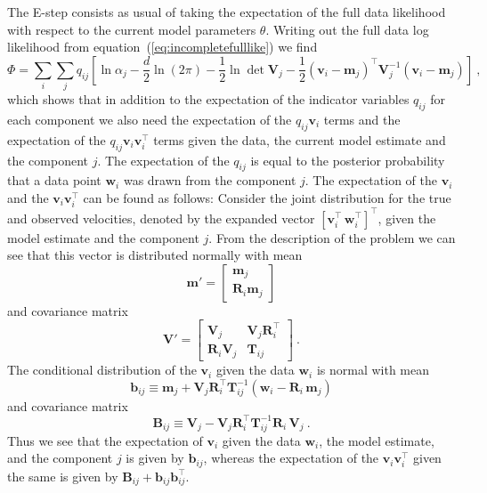 \documentclass[aoas,preprint,authoryear,round]{imsart}
\newcommand{\eqnnumber}{equation}
\renewcommand{\vec}[1]{\mathbf{#1}} %
\newcommand{\bb}{\vec{b}}
\newcommand{\mm}{\vec{m}}
\newcommand{\vv}{\vec{v}}
\newcommand{\ww}{\vec{w}}
\newcommand{\bij}{\bb_{ij}}
\newcommand{\bbij}{\bij}
\newcommand{\mmj}{\mm_j}
\newcommand{\vvi}{\vv_i}
\newcommand{\wwi}{\ww_i}
\newcommand{\ten}[1]{\mathbf{#1}} %
\newcommand{\BB}{\ten{B}}
\newcommand{\RR}{\ten{R}}
\newcommand{\TT}{\ten{T}}
\newcommand{\VV}{\ten{V}}
\newcommand{\BBij}{\BB_{ij}}
\newcommand{\RRi}{\RR_i}
\newcommand{\VVj}{\VV_{\!j}} %
\newcommand{\TTij}{\TT_{ij}}
\newcommand{\T}{^{\scriptscriptstyle \top}}   %
\newcommand{\qij}{q_{ij}}
\newcommand{\matrixleft}{\left[}
\newcommand{\matrixright}{\right]}
\begin{document}
The E-step consists as usual of taking the expectation of the
full data likelihood with respect to the current model parameters
$\theta$. Writing out the full data log likelihood from \eqnnumber\
(\ref{eq:incompletefulllike}) we find 
\begin{equation}
\Phi = \sum_i \sum_j \qij \left[ \ln \alpha_j -\frac{d}{2} \ln (2 \pi) - \frac{1}{2} \ln \det \VVj -\frac{1}{2} (\vv_i - \mmj)\T \VVj^{-1} (\vv_i - \mmj) \right]\ ,
\end{equation}
which shows that in addition to the expectation of the indicator
variables $\qij$ for each component we also need the expectation of
the $\qij\vvi$ terms and the expectation of the $\qij\vvi\vvi\T$ terms
given the data, the current model estimate and the component $j$. The
expectation of the $\qij$ is equal to the posterior probability that a
data point $\wwi$ was drawn from the component $j$. The expectation of
the $\vvi$ and the $\vvi\vvi\T$ can be found as follows: Consider the
joint distribution for the true and observed velocities, denoted by
the expanded vector $\matrixleft\vvi\T \,\wwi\T\matrixright\T$, given
the model estimate and the component $j$. From the description of the
problem we can see that this vector is distributed normally with mean
\begin{equation}\label{eq:combinedmean}
\mm' = \matrixleft \begin{array}{c} \mmj \\ \RRi\mmj \end{array}\matrixright
\end{equation}
and covariance matrix
\begin{equation}\label{eq:combinedcovar}
\VV' = \matrixleft\begin{array}{cc} \VVj & \VVj\RRi\T \\ \RRi\VVj & \TTij \end{array} \matrixright \ .
\end{equation}
The conditional distribution of the $\vvi$ given the data $\wwi$ is
normal with mean
\begin{equation}\label{eq:bbij}
\bbij \equiv \mmj + \VVj \RRi\T \TTij^{-1} (\wwi - \RRi\,\mmj)
\end{equation}
and covariance matrix
\begin{equation}\label{eq:BBij}
\BBij \equiv \VVj - \VVj\RRi\T \TTij^{-1} \RRi\,\VVj \ .
\end{equation}
Thus we see that the expectation of $\vvi$ given the data $\wwi$, the
model estimate, and the component $j$ is given by $\bbij$, whereas the
expectation of the $\vvi\vvi\T$ given the same is given by
$\BBij + \bbij\bbij\T$.
\end{document}
